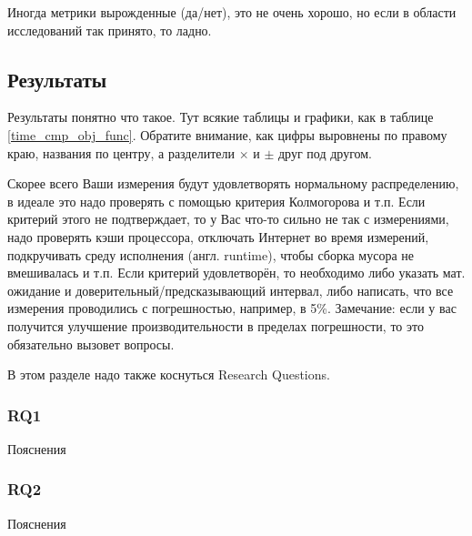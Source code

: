 \noindent Иногда метрики вырожденные (да/нет), это не очень хорошо, но если в области исследований так принято, то ладно.

\subsection{Результаты}
Результаты понятно что такое. Тут всякие таблицы и графики, как в таблице \ref{time_cmp_obj_func}. Обратите внимание, как цифры выровнены по правому краю, названия по центру, а разделители $\times$ и $\pm$ друг под другом.

Скорее всего Ваши измерения будут удовлетворять нормальному распределению, в идеале это надо проверять с помощью критерия Кол\-могорова и т.п.
Если критерий этого не подтверждает, то у Вас что-то сильно не так с измерениями, надо проверять кэши процессора, отключать Интернет во время измерений, подкручивать среду исполне\-ния (англ. runtime), что\-бы сборка мусора не вмешивалась и т.п.
Если критерий удовлетворён, то необходимо либо указать мат. ожидание и доверительный/предсказы\-вающий интервал, либо написать, что все измерения проводились с погрешностью, например, в 5\%.
Замечание: если у вас получится улуч\-шение производительности в пределах погреш\-ности, то это обязательно вызовет вопросы.

В этом разделе надо также коснуться Research Questions.

\subsubsection{RQ1} Пояснения
\subsubsection{RQ2} Пояснения

